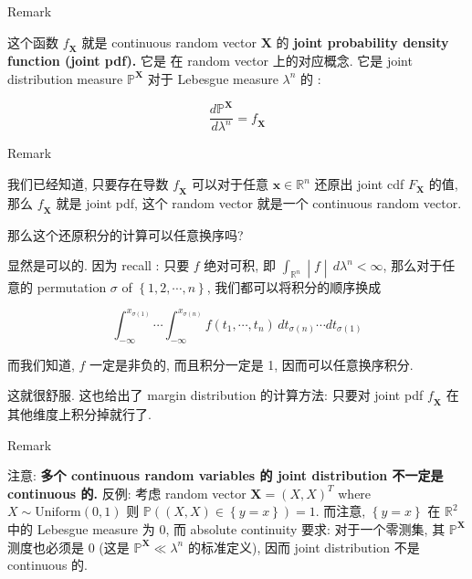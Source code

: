 \begin{qlremark}{Remark}

这个函数 \(\mathit{f}_{\mathbf{X}}\) 就是 continuous random vector \(\mathbf{X}\) 的 \textbf{joint probability density function (joint pdf).} 它是  在 random vector 上的对应概念. 它是 joint distribution measure \(\mathbb{P}^{\mathbf{X}}\) 对于 Lebesgue measure \(\mathit{\lambda}^{\mathit{n}}\) 的 :

\[\frac{\mathit{d}\mathbb{P}^{\mathbf{X}}}{\mathit{d}\mathit{\lambda}^{\mathit{n}}} = \mathit{f}_{\mathbf{X}}\]

\end{qlremark}

\begin{qlremark}{Remark}

我们已经知道, 只要存在导数 \(\mathit{f}_{\mathbf{X}}\) 可以对于任意 \(\mathbf{x} \in \mathbb{R}^{\mathit{n}}\) 还原出 joint cdf \(\mathit{F}_{\mathbf{X}}\) 的值, 那么 \(\mathit{f}_{\mathbf{X}}\) 就是 joint pdf, 这个 random vector 就是一个 continuous random vector.

那么这个还原积分的计算可以任意换序吗?

显然是可以的. 因为 recall : 只要 \(\mathit{f}\) 绝对可积, 即 \(\left. \int_{\mathbb{R}^{\mathit{n}}} \middle| \mathit{f} \middle| \,\mathit{d}\mathit{\lambda}^{\mathit{n}} < \infty \right.\), 那么对于任意的 permutation \(\mathit{\sigma}\) of \(\left\{ {1,2,\cdots,\mathit{n}} \right\}\), 我们都可以将积分的顺序换成

\[\int_{- \infty}^{\mathit{x}_{\mathit{\sigma}(1)}}\cdots\int_{- \infty}^{\mathit{x}_{\mathit{\sigma}(\mathit{n})}}\mathit{f}(\mathit{t}_{1},\cdots,\mathit{t}_{\mathit{n}})\,\mathit{d}\mathit{t}_{\mathit{\sigma}(\mathit{n})}\cdots\mathit{d}\mathit{t}_{\mathit{\sigma}(1)}\]

而我们知道, \(\mathit{f}\) 一定是非负的, 而且积分一定是 1, 因而可以任意换序积分.

这就很舒服. 这也给出了 margin distribution 的计算方法: 只要对 joint pdf \(\mathit{f}_{\mathbf{X}}\) 在其他维度上积分掉就行了.

\end{qlremark}

\begin{qlremark}{Remark}

注意: \textbf{多个 continuous random variables 的 joint distribution 不一定是 continuous 的.} 反例: 考虑 random vector \(\mathbf{X} = (\mathit{X},\mathit{X})^{\mathit{T}}\) where \(\mathit{X} \sim \text{Uniform}(0,1)\) 则 \(\mathbb{P}((\mathit{X},\mathit{X}) \in \left\{ {\mathit{y} = \mathit{x}} \right\}) = 1\). 而注意, \(\left\{ {\mathit{y} = \mathit{x}} \right\}\) 在 \(\mathbb{R}^{2}\) 中的 Lebesgue measure 为 0, 而 absolute continuity 要求: 对于一个零测集, 其 \(\mathbb{P}^{\mathbf{X}}\) 测度也必须是 0 (这是 \(\mathbb{P}^{\mathbf{X}} \ll \mathit{\lambda}^{\mathit{n}}\) 的标准定义), 因而 joint distribution 不是 continuous 的.

\end{qlremark}

